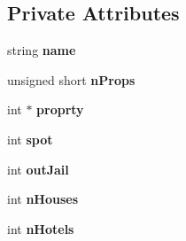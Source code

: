 \subsection*{Private Attributes}
\begin{DoxyCompactItemize}
\item 
\mbox{\label{class_player_acf0355128a99ee20ad9931b760fb2de1}} 
string {\bfseries name}
\item 
\mbox{\label{class_player_ae2bb900a8eaa9f44058edce4fd116e0d}} 
unsigned short {\bfseries n\+Props}
\item 
\mbox{\label{class_player_ae8e6a6cc0177624e8ed30b8f95f049c0}} 
int $\ast$ {\bfseries proprty}
\item 
\mbox{\label{class_player_a572b8db7cfdd88a9af932a1f7a610641}} 
int {\bfseries spot}
\item 
\mbox{\label{class_player_ab90c8c07e91ee36012185229c5abc3d7}} 
int {\bfseries out\+Jail}
\item 
\mbox{\label{class_player_ab151fc3b7160af7b89ca356ac5107d4d}} 
int {\bfseries n\+Houses}
\item 
\mbox{\label{class_player_aa0ac76798f3a75d5163b9fb887e4c7a3}} 
int {\bfseries n\+Hotels}
\end{DoxyCompactItemize}
